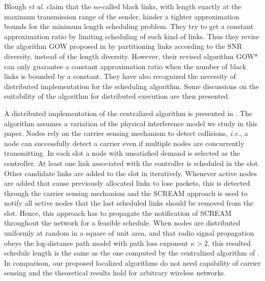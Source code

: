 \documentclass[journal]{IEEEtran}
\begin{document}
Blough \emph{et al.} \cite{S:phy17} claim that the so-called black links, with length exactly at the maximum transmission range of the sender, hinder a tighter approximation bounds for the minimum length scheduling problem. They try to get a constant approximation ratio by limiting scheduling of such kind of links. Thus they revise the algorithm GOW proposed in \cite{S:phy1} by partitioning links according to the SNR diversity, instead of the length diversity. However, their revised algorithm GOW* can only guarantee a constant approximation ratio when the number of black links is bounded by a constant. They have also recognized the necessity of distributed implementation for the scheduling algorithm. Some discussions on the suitability of the algorithm for distributed execution are then presented.

A distributed implementation of the centralized algorithm \cite{Brar-mobicom06} is presented in \cite{brar-icdcs08}. The algorithm assumes a variation of the physical interference model we study in this paper. Nodes rely on the carrier sensing mechanism to detect collisions, \emph{i.e.}, a node can successfully detect a carrier even if multiple nodes are concurrently transmitting. In each slot a node with unsatisfied demand is selected as the controller. At least one link associated with the controller is scheduled in the slot. Other candidate links are added to the slot in iteratively. Whenever active nodes are added that cause previously allocated links to lose packets, this is detected through the carrier sensing mechanism and the SCREAM approach is used to notify all active nodes that the last scheduled links should be removed from the slot. Hence, this approach has to propagate the notification of SCREAM throughout the network for a feasible schedule.
When nodes are distributed uniformly at random in a square of unit area, and that radio signal propagation obeys the log-distance path model with path loss exponent $\kappa > 2$, this resulted schedule length is the same as the one computed by the centralized algorithm of \cite{Brar-mobicom06}. In comparison, our proposed localized algorithms  do not need capability of carrier sensing and the theoretical results hold for arbitrary wireless networks.
\end{document}
